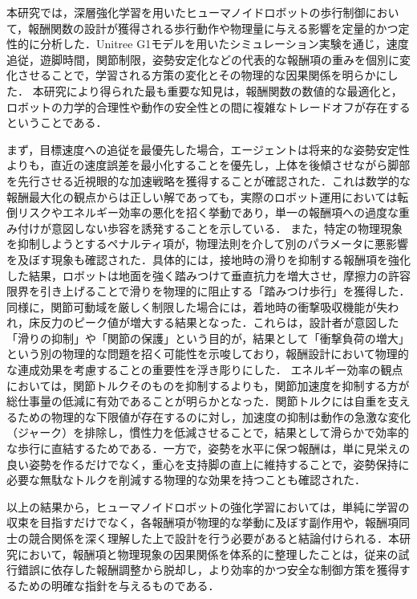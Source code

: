 
本研究では，深層強化学習を用いたヒューマノイドロボットの歩行制御において，報酬関数の設計が獲得される歩行動作や物理量に与える影響を定量的かつ定性的に分析した．Unitree G1モデルを用いたシミュレーション実験を通じ，速度追従，遊脚時間，関節制限，姿勢安定化などの代表的な報酬項の重みを個別に変化させることで，学習される方策の変化とその物理的な因果関係を明らかにした．
本研究により得られた最も重要な知見は，報酬関数の数値的な最適化と，ロボットの力学的合理性や動作の安全性との間に複雑なトレードオフが存在するということである．

まず，目標速度への追従を最優先した場合，エージェントは将来的な姿勢安定性よりも，直近の速度誤差を最小化することを優先し，上体を後傾させながら脚部を先行させる近視眼的な加速戦略を獲得することが確認された．これは数学的な報酬最大化の観点からは正しい解であっても，実際のロボット運用においては転倒リスクやエネルギー効率の悪化を招く挙動であり，単一の報酬項への過度な重み付けが意図しない歩容を誘発することを示している．
また，特定の物理現象を抑制しようとするペナルティ項が，物理法則を介して別のパラメータに悪影響を及ぼす現象も確認された．具体的には，接地時の滑りを抑制する報酬項を強化した結果，ロボットは地面を強く踏みつけて垂直抗力を増大させ，摩擦力の許容限界を引き上げることで滑りを物理的に阻止する「踏みつけ歩行」を獲得した．同様に，関節可動域を厳しく制限した場合には，着地時の衝撃吸収機能が失われ，床反力のピーク値が増大する結果となった．これらは，設計者が意図した「滑りの抑制」や「関節の保護」という目的が，結果として「衝撃負荷の増大」という別の物理的な問題を招く可能性を示唆しており，報酬設計において物理的な連成効果を考慮することの重要性を浮き彫りにした．
エネルギー効率の観点においては，関節トルクそのものを抑制するよりも，関節加速度を抑制する方が総仕事量の低減に有効であることが明らかとなった．関節トルクには自重を支えるための物理的な下限値が存在するのに対し，加速度の抑制は動作の急激な変化（ジャーク）を排除し，慣性力を低減させることで，結果として滑らかで効率的な歩行に直結するためである．一方で，姿勢を水平に保つ報酬は，単に見栄えの良い姿勢を作るだけでなく，重心を支持脚の直上に維持することで，姿勢保持に必要な無駄なトルクを削減する物理的な効果を持つことも確認された．

以上の結果から，ヒューマノイドロボットの強化学習においては，単純に学習の収束を目指すだけでなく，各報酬項が物理的な挙動に及ぼす副作用や，報酬項同士の競合関係を深く理解した上で設計を行う必要があると結論付けられる．本研究において，報酬項と物理現象の因果関係を体系的に整理したことは，従来の試行錯誤に依存した報酬調整から脱却し，より効率的かつ安全な制御方策を獲得するための明確な指針を与えるものである．